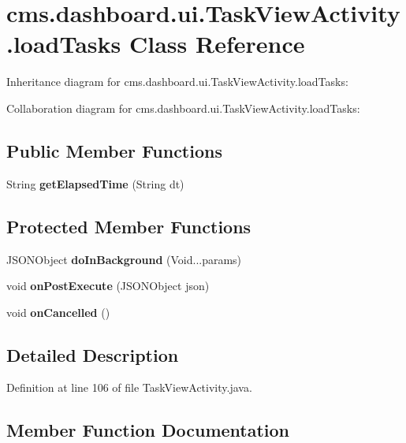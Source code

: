 \section{cms.\-dashboard.\-ui.\-Task\-View\-Activity.\-load\-Tasks \-Class \-Reference}
\label{classcms_1_1dashboard_1_1ui_1_1_task_view_activity_1_1load_tasks}


\-Inheritance diagram for cms.\-dashboard.\-ui.\-Task\-View\-Activity.\-load\-Tasks\-:


\-Collaboration diagram for cms.\-dashboard.\-ui.\-Task\-View\-Activity.\-load\-Tasks\-:
\subsection*{\-Public \-Member \-Functions}
\begin{DoxyCompactItemize}
\item 
\-String {\bf get\-Elapsed\-Time} (\-String dt)
\end{DoxyCompactItemize}
\subsection*{\-Protected \-Member \-Functions}
\begin{DoxyCompactItemize}
\item 
\-J\-S\-O\-N\-Object {\bf do\-In\-Background} (\-Void...\-params)
\item 
void {\bf on\-Post\-Execute} (\-J\-S\-O\-N\-Object json)
\item 
void {\bf on\-Cancelled} ()
\end{DoxyCompactItemize}


\subsection{\-Detailed \-Description}


\-Definition at line 106 of file \-Task\-View\-Activity.\-java.



\subsection{\-Member \-Function \-Documentation}
